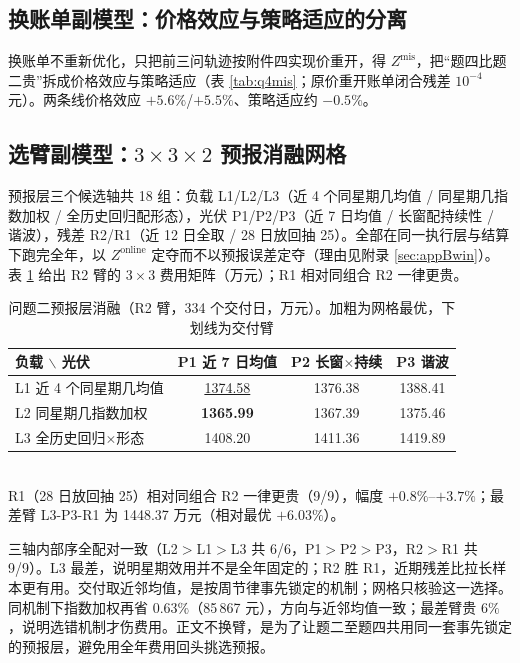 \documentclass[12pt,a4paper]{ctexart}
\newcommand{\Zon}{Z^{\mathrm{online}}}
\newcommand{\Zmis}{Z^{\mathrm{mis}}}
\begin{document}
\subsection{换账单副模型：价格效应与策略适应的分离}

换账单不重新优化，只把前三问轨迹按附件四实现价重开，得 $\Zmis$，把“题四比题二贵”拆成价格效应与策略适应（表 \ref{tab:q4mis}；原价重开账单闭合残差 $10^{-4}$ 元）。两条线价格效应 $+5.6\%$/$+5.5\%$、策略适应约 $-0.5\%$。

\subsection{选臂副模型：$3\times3\times2$ 预报消融网格}

预报层三个候选轴共 18 组：负载 L1/L2/L3（近 4 个同星期几均值 / 同星期几指数加权 / 全历史回归配形态），光伏 P1/P2/P3（近 7 日均值 / 长窗配持续性 / 谐波），残差 R2/R1（近 12 日全取 / 28 日放回抽 25）。全部在同一执行层与结算下跑完全年，以 $\Zon$ 定夺而不以预报误差定夺（理由见附录 \ref{sec:appBwin}）。表 \ref{tab:aux_grid} 给出 R2 臂的 $3\times3$ 费用矩阵（万元）；R1 相对同组合 R2 一律更贵。

\begin{table}[H]
\centering\small
\caption{问题二预报层消融（R2 臂，334 个交付日，万元）。加粗为网格最优，下划线为交付臂}
\begin{tabular}{lccc}
\toprule
负载 $\backslash$ 光伏 & P1 近 7 日均值 & P2 长窗$\times$持续 & P3 谐波 \\
\midrule
L1 近 4 个同星期几均值 & \underline{1374.58} & 1376.38 & 1388.41 \\
L2 同星期几指数加权 & \textbf{1365.99} & 1367.39 & 1375.46 \\
L3 全历史回归$\times$形态 & 1408.20 & 1411.36 & 1419.89 \\
\bottomrule
\end{tabular}\\[2pt]
{\footnotesize R1（28 日放回抽 25）相对同组合 R2 一律更贵（9/9），幅度 $+0.8\%$--$+3.7\%$；最差臂 L3-P3-R1 为 1448.37 万元（相对最优 $+6.03\%$）。}
\label{tab:aux_grid}
\end{table}

三轴内部序全配对一致（L2$>$L1$>$L3 共 6/6，P1$>$P2$>$P3，R2$>$R1 共 9/9）。L3 最差，说明星期效用并不是全年固定的；R2 胜 R1，近期残差比拉长样本更有用。交付取近邻均值，是按周节律事先锁定的机制；网格只核验这一选择。同机制下指数加权再省 $0.63\%$（85\,867 元），方向与近邻均值一致；最差臂贵 $6\%$，说明选错机制才伤费用。正文不换臂，是为了让题二至题四共用同一套事先锁定的预报层，避免用全年费用回头挑选预报。
\end{document}
